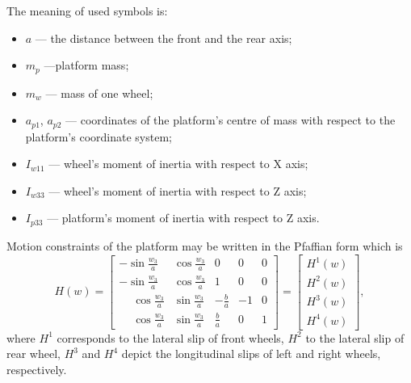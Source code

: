 The meaning of used symbols is:
\begin{itemize}
\item $a$ --- the distance between the front and the rear axis;
\item $m_p$ ---platform mass;
\item $m_w$ --- mass of one wheel;
\item $a_{p1}$, $a_{p2}$ --- coordinates of the platform's centre of mass with respect to the platform's coordinate system;
\item $I_{w11}$ --- wheel's moment of inertia with respect to X axis;
\item $I_{w33}$ --- wheel's moment of inertia with respect to Z axis;
\item $I_{p33}$ --- platform's moment of inertia with respect to Z axis.

\end{itemize}

Motion constraints of the platform may be written in the Pfaffian form which is 
\begin{equation}
\label{eq:pfaff}
H(w)=\begin{bmatrix}
-\sin\frac{w_3}{a} & \cos\frac{w_3}{a} & 0 & 0 & 0\\
-\sin\frac{w_3}{a} & \cos\frac{w_3}{a} & 1 & 0 & 0\\
\phantom{-}\cos\frac{w_3}{a} & \sin\frac{w_3}{a} & -\frac{b}{a} & -1 & 0\\
 \phantom{-}\cos\frac{w_3}{a} & \sin\frac{w_3}{a} &  \frac{b}{a} &  0 & 1
\end{bmatrix} = \begin{bmatrix}
H^1(w)\\
H^2(w)\\
H^3(w)\\
H^4(w)
\end{bmatrix},
\end{equation}
where $H^1$ corresponds to the lateral slip of front wheels, $H^2$ to the lateral slip of rear wheel, $H^3$ and $H^4$ depict the longitudinal slips of left and right wheels, respectively.

